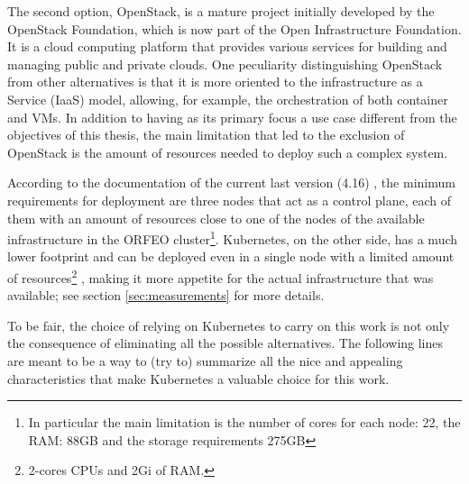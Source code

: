 The second option, OpenStack, is a mature project initially developed by the
OpenStack Foundation, which is now part of the Open Infrastructure Foundation.
It is a cloud computing platform that provides various services for building and
managing public and private clouds.
One peculiarity distinguishing OpenStack from other alternatives is that it is
more oriented to the infrastructure as a Service (IaaS) model, allowing, for
example, the orchestration of both container and VMs.
In addition to having as its primary focus a use case different from the
objectives of this thesis, the main limitation that led to the exclusion of
OpenStack is the amount of resources needed to deploy such a complex system.

According to the documentation of the current last version (4.16)
\cite{openstakinstallationdoc}, the minimum requirements for deployment are
three nodes that act as a control plane, each of them with an amount of
resources close to one of the nodes of the available infrastructure in the ORFEO
cluster\footnote{In particular the main limitation is the number of cores for
  each node: 22, the RAM: 88GB and the storage requirements 275GB}.
Kubernetes, on the other side, has a much lower footprint and can be deployed
even in a single node with a limited amount of resources\footnote{2-cores CPUs
  and 2Gi of RAM.} \cite{kdoc-installation}, making it more appetite for the
actual infrastructure that was available; see section \ref{sec:measurements} for
more details.

To be fair, the choice of relying on Kubernetes to carry on this work is not
only the consequence of eliminating all the possible alternatives.
The following lines are meant to be a way to (try to) summarize all the nice and
appealing characteristics that make Kubernetes a valuable choice for this work.



